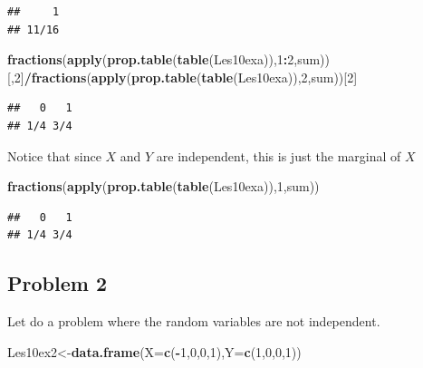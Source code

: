 \documentclass[]{book}
\newenvironment{Shaded}{\begin{snugshade}}{\end{snugshade}}
\newcommand{\KeywordTok}[1]{\textcolor[rgb]{0.13,0.29,0.53}{\textbf{#1}}}
\newcommand{\DataTypeTok}[1]{\textcolor[rgb]{0.13,0.29,0.53}{#1}}
\newcommand{\DecValTok}[1]{\textcolor[rgb]{0.00,0.00,0.81}{#1}}
\newcommand{\OperatorTok}[1]{\textcolor[rgb]{0.81,0.36,0.00}{\textbf{#1}}}
\newcommand{\NormalTok}[1]{#1}
\theoremstyle{definition}
\theoremstyle{definition}
\theoremstyle{definition}
\theoremstyle{remark}
\begin{document}
\begin{verbatim}
##     1 
## 11/16
\end{verbatim}

\begin{Shaded}
\begin{Highlighting}[]
\KeywordTok{fractions}\NormalTok{(}\KeywordTok{apply}\NormalTok{(}\KeywordTok{prop.table}\NormalTok{(}\KeywordTok{table}\NormalTok{(Les10exa)),}\DecValTok{1}\OperatorTok{:}\DecValTok{2}\NormalTok{,sum))[,}\DecValTok{2}\NormalTok{]}\OperatorTok{/}\KeywordTok{fractions}\NormalTok{(}\KeywordTok{apply}\NormalTok{(}\KeywordTok{prop.table}\NormalTok{(}\KeywordTok{table}\NormalTok{(Les10exa)),}\DecValTok{2}\NormalTok{,sum))[}\DecValTok{2}\NormalTok{]}
\end{Highlighting}
\end{Shaded}

\begin{verbatim}
##   0   1 
## 1/4 3/4
\end{verbatim}

Notice that since \(X\) and \(Y\) are independent, this is just the
marginal of \(X\)

\begin{Shaded}
\begin{Highlighting}[]
\KeywordTok{fractions}\NormalTok{(}\KeywordTok{apply}\NormalTok{(}\KeywordTok{prop.table}\NormalTok{(}\KeywordTok{table}\NormalTok{(Les10exa)),}\DecValTok{1}\NormalTok{,sum))}
\end{Highlighting}
\end{Shaded}

\begin{verbatim}
##   0   1 
## 1/4 3/4
\end{verbatim}

\subsection{Problem 2}\label{problem-2}

Let do a problem where the random variables are not independent.

\begin{Shaded}
\begin{Highlighting}[]
\NormalTok{Les10ex2<-}\KeywordTok{data.frame}\NormalTok{(}\DataTypeTok{X=}\KeywordTok{c}\NormalTok{(}\OperatorTok{-}\DecValTok{1}\NormalTok{,}\DecValTok{0}\NormalTok{,}\DecValTok{0}\NormalTok{,}\DecValTok{1}\NormalTok{),}\DataTypeTok{Y=}\KeywordTok{c}\NormalTok{(}\DecValTok{1}\NormalTok{,}\DecValTok{0}\NormalTok{,}\DecValTok{0}\NormalTok{,}\DecValTok{1}\NormalTok{))}
\end{Highlighting}
\end{Shaded}
\end{document}
